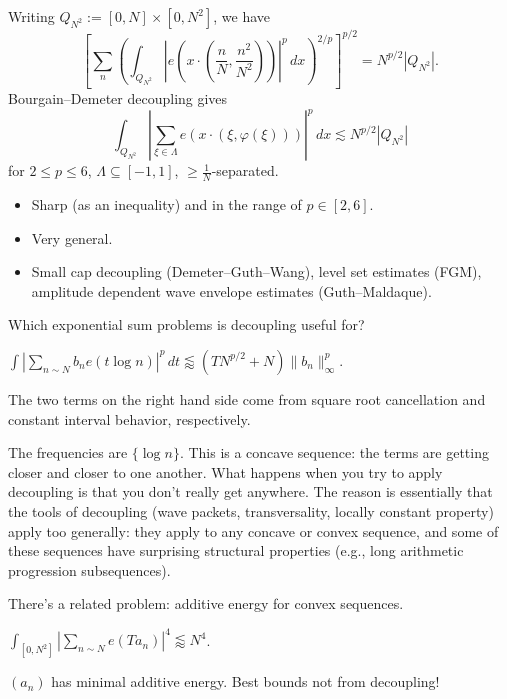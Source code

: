 \documentclass[reqno]{amsart} 
\numberwithin{theorem}{section}
\numberwithin{equation}{section}
\begin{document}
Writing $Q_{N^2} :=[0, N] \times[0, N^2]$, we have
\begin{equation*}
  \left[ \sum_n \left( \int_{Q_{N^2}} \left\lvert e\left(x \cdot \left( \frac{n}{N}, \frac{n^2}{N^2} \right)\right) \right\rvert^p \, d x \right)^{2/p} \right]^{p/2}
  = N^{p/2} \left\lvert Q_{N^2} \right\rvert.
\end{equation*}
Bourgain--Demeter decoupling gives
\begin{equation*}
  \int_{Q_{N^2}} \left\lvert \sum_{\xi \in \Lambda}
    e \left( x \cdot(\xi, \varphi(\xi)) \right)\right\rvert^p \, d x
  \lesssim N^{p/2} \left\lvert Q_{N^2} \right\rvert
\end{equation*}
for $2 \leq p \leq 6$, $\Lambda \subseteq[-1, 1]$, $\geq \tfrac{1}{N}$-separated.
\begin{itemize}
\item Sharp (as an inequality) and in the range of $p \in[2, 6]$.
\item Very general.
\item Small cap decoupling (Demeter--Guth--Wang), level set estimates (FGM), amplitude dependent wave envelope estimates (Guth--Maldaque).
\end{itemize}

Which exponential sum problems is decoupling useful for?

\begin{conjecture}
  $\int \left\lvert \sum_{n \sim N} b_n e(t \log n) \right\rvert^p \, d t \lessapprox \left( T N^{p/2} + N  \right) \lVert b_n \rVert_\infty^p$.
\end{conjecture}
The two terms on the right hand side come from square root cancellation and constant interval behavior, respectively.

The frequencies are $\{\log n\}$.  This is a concave sequence: the terms are getting closer and closer to one another.  What happens when you try to apply decoupling is that you don't really get anywhere.  The reason is essentially that the tools of decoupling (wave packets, transversality, locally constant property) apply too generally: they apply to any concave or convex sequence, and some of these sequences have surprising structural properties (e.g., long arithmetic progression subsequences).

There's a related problem: additive energy for convex sequences.
\begin{conjecture}
  $\int_{[0, N^2]} \left\lvert \sum_{n \sim N} e(T a_n)\right\rvert^4  \lessapprox N^4$.
\end{conjecture}
$(a_n)$ has minimal additive energy.  Best bounds not from decoupling!
\end{document}
